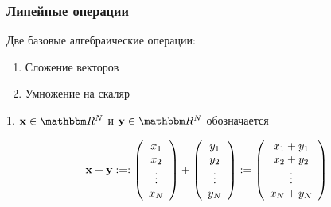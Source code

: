\begin{frame}
    \frametitle{Линейные операции}

    \vspace{2em}
    
    Две базовые алгебраические операции: 
    \begin{enumerate}
        \item Сложение векторов 
        \item Умножение на скаляр
    \end{enumerate}
    
    
    1.  $\boldx \in \RR^N$ и $\boldy \in \RR^N$ обозначается
    
    \begin{equation*}
        {\mathbf x} + {\mathbf y} 
        :=: 
        \left(
        \begin{array}{c}
            x_1 \\
            x_2 \\
            \vdots \\
            x_N
        \end{array}
        \right)
        +
        \left(
        \begin{array}{c}
             y_1 \\
             y_2 \\
            \vdots \\
             y_N
        \end{array}
        \right)
        :=
        \left(
        \begin{array}{c}
            x_1 + y_1 \\
            x_2 + y_2 \\
            \vdots \\
            x_N + y_N
        \end{array}
        \right)
    \end{equation*}


\end{frame}


